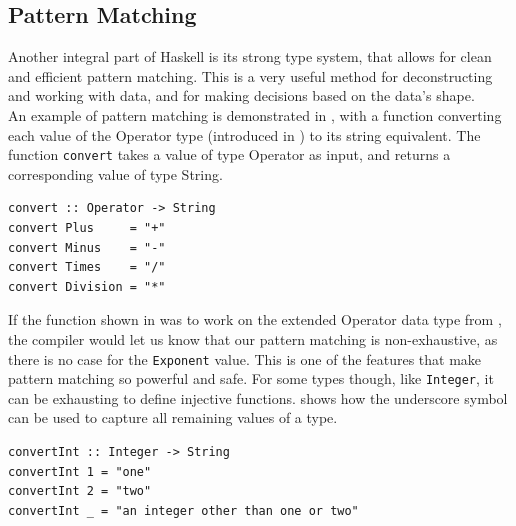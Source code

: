 \subsection{Pattern Matching}

Another integral part of Haskell is its strong type system, that allows for clean and efficient pattern matching. This is a very useful method for deconstructing and working with data, and for making decisions based on the data's shape. \\

An example of pattern matching is demonstrated in , with a function converting each value of the Operator type (introduced in ) to its string equivalent. The function \texttt{convert} takes a value of type Operator as input, and returns a corresponding value of type String. \\

\begin{lstlisting}[caption={Haskell function converting values of one type to another.}, captionpos=b, label={Haskell function converting values of one type to another.}]
convert :: Operator -> String
convert Plus     = "+"
convert Minus    = "-"
convert Times    = "/"
convert Division = "*"
\end{lstlisting}

If the function shown in  was to work on the extended Operator data type from , the compiler would let us know that our pattern matching is non-exhaustive, as there is no case for the \texttt{Exponent} value. This is one of the features that make pattern matching so powerful and safe. For some types though, like \texttt{Integer}, it can be exhausting to define injective functions.  shows how the underscore symbol can be used to capture all remaining values of a type. \\

\begin{lstlisting}[caption={A rather lazy Haskell function attempting to convert values of type Integer to its string equivalent.}, captionpos=b, label={A rather lazy Haskell.}]
convertInt :: Integer -> String
convertInt 1 = "one"
convertInt 2 = "two"
convertInt _ = "an integer other than one or two"
\end{lstlisting}

